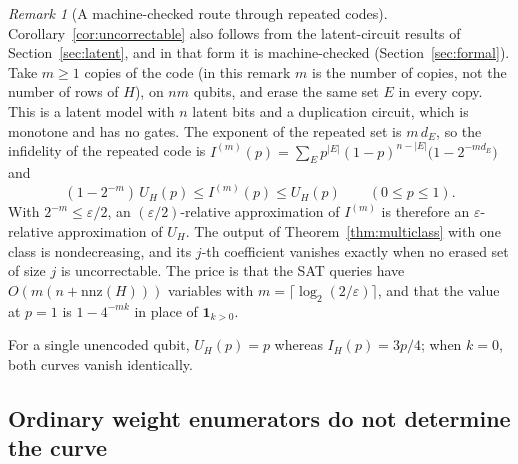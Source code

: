 \documentclass[11pt]{article}
\theoremstyle{remark}
\newtheorem{remark}[theorem]{Remark}
\newcommand{\eps}{\varepsilon}
\begin{document}
\begin{remark}[A machine-checked route through repeated codes]
\label{rem:uncorrectable-machine}
Corollary~\ref{cor:uncorrectable} also follows from the latent-circuit
results of Section~\ref{sec:latent}, and in that form it is
machine-checked (Section~\ref{sec:formal}). Take \(m\ge1\) copies of the
code (in this remark \(m\) is the number of copies, not the number of
rows of \(H\)), on \(nm\) qubits, and erase the same set \(E\) in every copy. This
is a latent model with \(n\) latent bits and a duplication circuit,
which is monotone and has no gates. The exponent of the repeated set is
\(m\,d_E\), so the infidelity of the repeated code is
\(I^{(m)}(p)=\sum_Ep^{|E|}(1-p)^{n-|E|}\bigl(1-2^{-m d_E}\bigr)\) and
\[
 (1-2^{-m})\,U_H(p)\le I^{(m)}(p)\le U_H(p)\qquad(0\le p\le1).
\]
With \(2^{-m}\le\eps/2\), an \((\eps/2)\)-relative approximation of
\(I^{(m)}\) is therefore an \(\eps\)-relative approximation of \(U_H\).
The output of Theorem~\ref{thm:multiclass} with one class is
nondecreasing, and its \(j\)-th coefficient vanishes exactly when no
erased set of size \(j\) is uncorrectable. The price is that the SAT
queries have \(O(m(n+\mathrm{nnz}(H)))\) variables with
\(m=\lceil\log_2(2/\eps)\rceil\), and that the value at \(p=1\) is
\(1-4^{-mk}\) in place of \(\mathbf1_{k>0}\).
\end{remark}

For a single unencoded qubit, \(U_H(p)=p\) whereas
\(I_H(p)=3p/4\); when \(k=0\), both curves vanish identically.

\subsection{Ordinary weight enumerators do not determine the curve}
\label{sec:enumerators}
\end{document}
